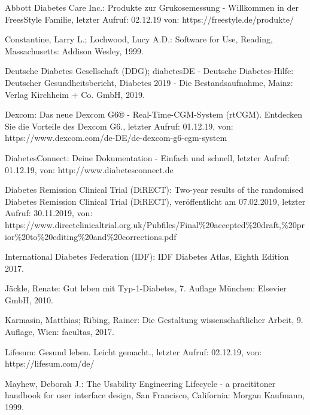 \documentclass[a4paper,11pt]{article}%
\renewcommand{\\}{\vspace*{0.5\baselineskip} \newline}
\begin{document}
\begin{thebibliography}{1}
	
	Abbott Diabetes Care Inc.:
	Produkte zur Grukosemessung - Willkommen in der FreesStyle Familie, letzter Aufruf: 02.12.19 von:
	https://freestyle.de/produkte/	
	
	Constantine, Larry L.; Lochwood, Lucy A.D.: 
	Software for Use, 
	Reading, Massachusetts: Addison Wesley,
	1999.
	
	Deutsche Diabetes Gesellschaft (DDG); diabetesDE - Deutsche Diabetes-Hilfe:
	Deutscher Gesundheitsbericht, Diabetes 2019 - Die Bestandsaufnahme, 
	Mainz: Verlag Kirchheim + Co. GmbH,
	2019.
	
	Dexcom:
	Das neue Dexcom G6® - Real-Time-CGM-System (rtCGM). Entdecken Sie die Vorteile des Dexcom G6., letzter Aufruf: 01.12.19, von: https://www.dexcom.com/de-DE/de-dexcom-g6-cgm-system
	
	DiabetesConnect:
	Deine Dokumentation - Einfach und schnell, letzter Aufruf: 01.12.19, von: http://www.diabetesconnect.de
	
	Diabetes Remission Clinical Trial (DiRECT):
	Two-year results of the randomised Diabetes Remission Clinical Trial (DiRECT), veröffentlicht am 07.02.2019, \newline
	letzter Aufruf: 30.11.2019, von: https://www.directclinicaltrial.org.uk/Pubfiles/Final\newline\%20accepted\%20draft,\%20prior\%20to\%20editing\%20and\%20corrections.pdf
	
	International Diabetes Federation (IDF): 
	IDF Diabetes Atlas, Eighth Edition 2017.
	
	Jäckle, Renate: 
	Gut leben mit Typ-1-Diabetes, 7. Auflage
	München: Elsevier GmbH,
	2010.
	
	Karmasin, Matthias; Ribing, Rainer: 
	Die Gestaltung wissenschaftlicher Arbeit, 9. Auflage,
	Wien: facultas,
	2017.
	
	Lifesum: Gesund leben. Leicht gemacht., letzter Aufruf: 02.12.19, von: \newline https://lifesum.com/de/
	
	
	Mayhew, Deborah J.: 
	The Usability Engineering Lifecycle - a pracititoner handbook for user interface design,
	San Francisco, California: Morgan Kaufmann,
	1999.
	

\end{thebibliography}
\end{document}
